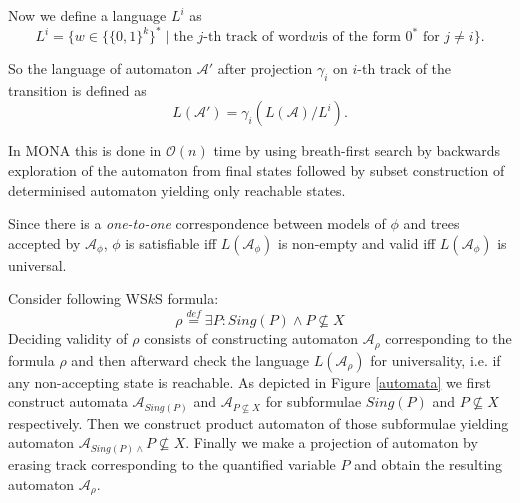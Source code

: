Now we define a language $L^i$ as
\begin{equation}
 L^i = \{w \in \{\{0, 1\}^k\}^* \mid \text{the $j$-th track of word} \mathit{w}
 \text{is of the form $0^*$ for $j \neq i$}\}. \end{equation}
 
 So the language of automaton $\mathcal{A}'$ after projection $\gamma_i$ on
 $i$-th track of the transition is defined as
 \begin{equation}
  L(\mathcal{A}') = \gamma_i(L(\mathcal{A}) / L^i).
 \end{equation}
 
 In \textsc{MONA} \cite{mona} this is done in $\mathcal{O}(n)$ time by using
 breath-first search by backwards exploration of the automaton from final
 states followed by subset construction of determinised automaton yielding only
 reachable states.

\begin{prop}
 Since there is a \emph{one-to-one} correspondence between models of $\phi$ and
 trees accepted by $\mathcal{A}_\phi$, $\phi$ is satisfiable iff
 $L(\mathcal{A}_\phi)$ is non-empty and valid iff $L(\mathcal{A}_\phi)$  is
 universal.
\end{prop}

  \noindent\hrulefill
  \begin{example}
  Consider following WS$k$S formula:
  \begin{equation}
  \rho \overset{\mathit{def}}{=} \exists P:
 Sing(P) \wedge P \not\subseteq X
  \end{equation}
  Deciding validity of $\rho$ consists of constructing automaton
  $\mathcal{A}_\rho$ corresponding to the formula $\rho$ and then afterward
  check the language $L(\mathcal{A}_\rho)$ for universality, i.e. if any
  non-accepting state is reachable. As depicted in Figure \ref{automata} we
  first construct automata $\mathcal{A}_{\mathit{Sing}(P)}$ and
  $\mathcal{A}_{P \not\subseteq X}$ for subformulae $\mathit{Sing}(P)$ and $P
  \not\subseteq X$ respectively. Then we construct product automaton of those
  subformulae yielding automaton $\mathcal{A}_{\mathit{Sing}(P) \wedge } P
  \not\subseteq X$. Finally we make a projection of automaton by erasing track
  corresponding to the quantified variable $P$ and obtain the resulting
  automaton $\mathcal{A}_\rho$.

  \end{example}\label{wsks-formula-restricted}
 
